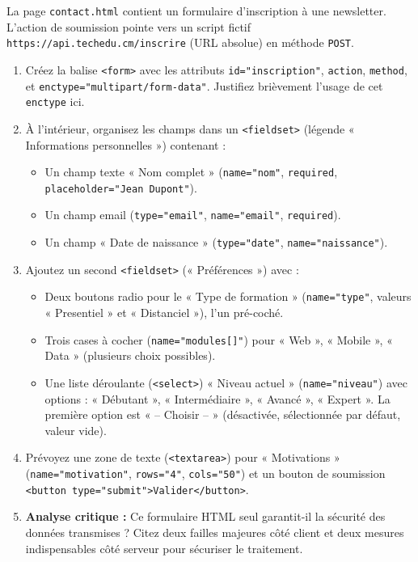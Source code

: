 \documentclass[11pt]{article}
\begin{document}
\begin{exercice}
La page \texttt{contact.html} contient un formulaire d'inscription à une newsletter. L'action de soumission pointe vers un script fictif \texttt{https://api.techedu.cm/inscrire} (URL absolue) en méthode \texttt{POST}.
\begin{enumerate}
    \item Créez la balise \texttt{<form>} avec les attributs \texttt{id="inscription"}, \texttt{action}, \texttt{method}, et \texttt{enctype="multipart/form-data"}. Justifiez brièvement l'usage de cet \texttt{enctype} ici.
    \item À l'intérieur, organisez les champs dans un \texttt{<fieldset>} (légende « Informations personnelles ») contenant :
    \begin{itemize}
        \item Un champ texte « Nom complet » (\texttt{name="nom"}, \texttt{required}, \texttt{placeholder="Jean Dupont"}).
        \item Un champ email (\texttt{type="email"}, \texttt{name="email"}, \texttt{required}).
        \item Un champ « Date de naissance » (\texttt{type="date"}, \texttt{name="naissance"}).
    \end{itemize}
    \item Ajoutez un second \texttt{<fieldset>} (« Préférences ») avec :
    \begin{itemize}
        \item Deux boutons radio pour le « Type de formation » (\texttt{name="type"}, valeurs « Presentiel » et « Distanciel »), l'un pré-coché.
        \item Trois cases à cocher (\texttt{name="modules[]"}) pour « Web », « Mobile », « Data » (plusieurs choix possibles).
        \item Une liste déroulante (\texttt{<select>}) « Niveau actuel » (\texttt{name="niveau"}) avec options : « Débutant », « Intermédiaire », « Avancé », « Expert ». La première option est « -- Choisir -- » (désactivée, sélectionnée par défaut, valeur vide).
    \end{itemize}
    \item Prévoyez une zone de texte (\texttt{<textarea>}) pour « Motivations » (\texttt{name="motivation"}, \texttt{rows="4"}, \texttt{cols="50"}) et un bouton de soumission \texttt{<button type="submit">Valider</button>}.
    \item \textbf{Analyse critique :} Ce formulaire HTML seul garantit-il la sécurité des données transmises ? Citez deux failles majeures côté client et deux mesures indispensables côté serveur pour sécuriser le traitement.
\end{enumerate}
\end{exercice}
\end{document}
